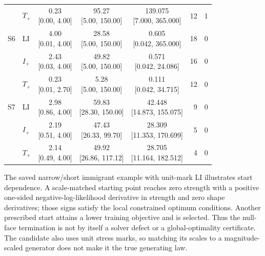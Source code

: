 \begin{table}[H]
\begin{tabular}{@{}llcccrr@{}}
 & $T_+$ & \shortstack{0.23\\{[}0.00, 4.00{]}} & \shortstack{95.27\\{[}5.00, 150.00{]}} & \shortstack{139.075\\{[}7.000, 365.000{]}} & 12 & 1\\
\addlinespace
S6 & LI & \shortstack{4.00\\{[}0.01, 4.00{]}} & \shortstack{28.58\\{[}5.00, 150.00{]}} & \shortstack{0.605\\{[}0.042, 365.000{]}} & 18 & 0\\
 & $I_+$ & \shortstack{2.43\\{[}0.03, 4.00{]}} & \shortstack{49.82\\{[}5.00, 150.00{]}} & \shortstack{0.571\\{[}0.042, 24.086{]}} & 16 & 0\\
 & $T_+$ & \shortstack{0.23\\{[}0.01, 2.70{]}} & \shortstack{5.28\\{[}5.00, 150.00{]}} & \shortstack{0.111\\{[}0.042, 34.715{]}} & 12 & 0\\
\addlinespace
S7 & LI & \shortstack{2.98\\{[}0.86, 4.00{]}} & \shortstack{59.83\\{[}28.30, 150.00{]}} & \shortstack{42.448\\{[}14.873, 155.075{]}} & 9 & 0\\
 & $I_+$ & \shortstack{2.19\\{[}0.51, 4.00{]}} & \shortstack{47.43\\{[}26.33, 99.70{]}} & \shortstack{28.309\\{[}11.353, 170.699{]}} & 5 & 0\\
 & $T_+$ & \shortstack{2.14\\{[}0.49, 4.00{]}} & \shortstack{49.92\\{[}26.86, 117.12{]}} & \shortstack{28.705\\{[}11.164, 182.512{]}} & 4 & 0\\
\bottomrule\end{tabular}\end{table}

The saved narrow/short immigrant example with unit-mark LI illustrates start dependence. A scale-matched starting point reaches zero strength with a positive one-sided negative-log-likelihood derivative in strength and zero shape derivatives; those signs satisfy the local constrained optimum conditions. Another prescribed start attains a lower training objective and is selected. Thus the null-face termination is not by itself a solver defect or a global-optimality certificate. The candidate also uses unit stress marks, so matching its scales to a magnitude-scaled generator does not make it the true generating law.
